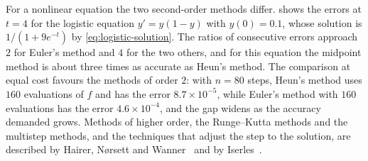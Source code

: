 For a nonlinear equation the two second-order methods differ.  shows the errors at $t=4$ for the logistic equation $y'=y(1-y)$ with $y(0)=0.1$, whose solution is $1/(1+9e^{-t})$ by \eqref{eq:logistic-solution}. The ratios of consecutive errors approach $2$ for Euler's method and $4$ for the two others, and for this equation the midpoint method is about three times as accurate as Heun's method. The comparison at equal cost favours the methods of order $2$: with $n=80$ steps, Heun's method uses $160$ evaluations of $f$ and has the error $8.7\times10^{-5}$, while Euler's method with $160$ evaluations has the error $4.6\times10^{-4}$, and the gap widens as the accuracy demanded grows. Methods of higher order, the Runge--Kutta methods and the multistep methods, and the techniques that adjust the step to the solution, are described by Hairer, N{\o}rsett and Wanner~\cite{hairer1993} and by Iserles~\cite{iserles2008}.

\begin{table}
\end{table}

